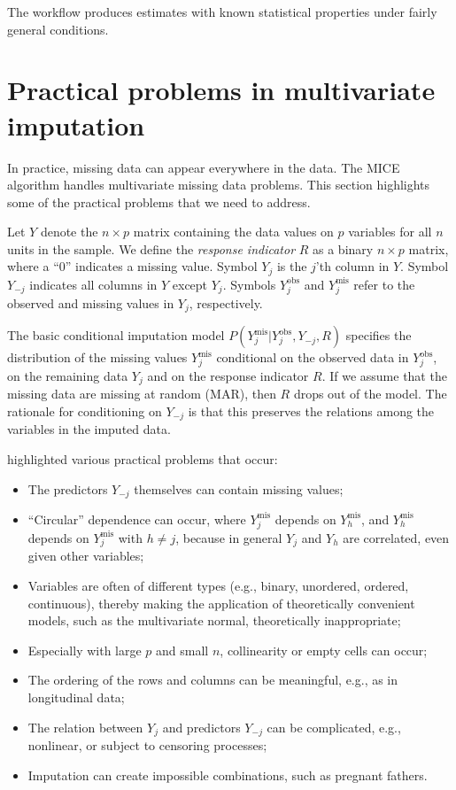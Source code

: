 \documentclass[
]{book}
\providecommand{\tightlist}{%
  \setlength{\itemsep}{0pt}\setlength{\parskip}{0pt}}
\begin{document}
The workflow produces estimates with known statistical properties under fairly general conditions.

\hypertarget{practical-problems-in-multivariate-imputation}{%
\section{Practical problems in multivariate imputation}\label{practical-problems-in-multivariate-imputation}}

In practice, missing data can appear everywhere in the data. The MICE algorithm handles multivariate missing data problems. This section highlights some of the practical problems that we need to address.

Let \(Y\) denote the \(n \times p\) matrix containing the data values on \(p\) variables for all \(n\) units in the sample. We define the \emph{response indicator} \(R\) as a binary \(n \times p\) matrix, where a ``0'' indicates a missing value. Symbol \(Y_j\) is the \(j\)'th column in \(Y\). Symbol \(Y_{-j}\) indicates all columns in \(Y\) except \(Y_j\). Symbols \(Y_j^\mathrm{obs}\) and \(Y_j^\mathrm{mis}\) refer to the observed and missing values in \(Y_j\), respectively.

The basic conditional imputation model \(P(Y_j^\mathrm{mis}|Y_j^\mathrm{obs}, Y_{-j}, R)\) specifies the distribution of the missing values \(Y_j^\mathrm{mis}\) conditional on the observed data in \(Y_j^\mathrm{obs}\), on the remaining data \(Y_j\) and on the response indicator \(R\). If we assume that the missing data are missing at random (MAR), then \(R\) drops out of the model. The rationale for conditioning on \(Y_{-j}\) is that this preserves the relations among the variables in the imputed data.

\citet{VANBUUREN2018} highlighted various practical problems that occur:

\begin{itemize}
\tightlist
\item
  The predictors \(Y_{-j}\) themselves can contain missing values;
\item
  ``Circular'' dependence can occur, where \(Y_j^\mathrm{mis}\) depends on \(Y_h^\mathrm{mis}\), and \(Y_h^\mathrm{mis}\) depends on \(Y_j^\mathrm{mis}\) with \(h \neq j\), because in general \(Y_j\) and \(Y_h\) are correlated, even given other variables;
\item
  Variables are often of different types (e.g., binary, unordered, ordered, continuous), thereby making the application of theoretically convenient models, such as the multivariate normal, theoretically inappropriate;
\item
  Especially with large \(p\) and small \(n\), collinearity or empty cells can occur;
\item
  The ordering of the rows and columns can be meaningful, e.g., as in longitudinal data;
\item
  The relation between \(Y_j\) and predictors \(Y_{-j}\) can be complicated, e.g., nonlinear, or subject to censoring processes;
\item
  Imputation can create impossible combinations, such as pregnant fathers.
\end{itemize}
\end{document}
